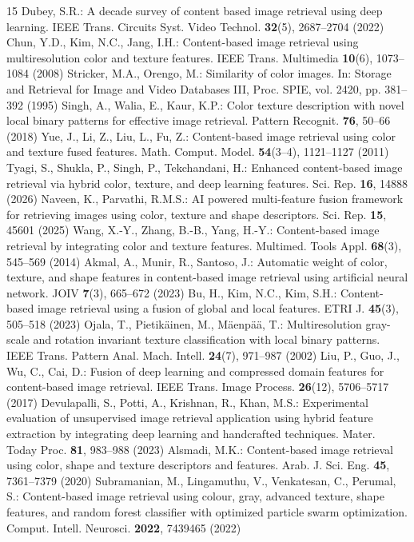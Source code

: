 \documentclass[pdflatex,sn-mathphys-num]{sn-jnl}
\begin{document}
\begin{thebibliography}{15}
 Dubey, S.R.: A decade survey of content based image retrieval using deep learning. IEEE Trans. Circuits Syst. Video Technol. \textbf{32}(5), 2687--2704 (2022)
 Chun, Y.D., Kim, N.C., Jang, I.H.: Content-based image retrieval using multiresolution color and texture features. IEEE Trans. Multimedia \textbf{10}(6), 1073--1084 (2008)
 Stricker, M.A., Orengo, M.: Similarity of color images. In: Storage and Retrieval for Image and Video Databases III, Proc. SPIE, vol. 2420, pp. 381--392 (1995)
 Singh, A., Walia, E., Kaur, K.P.: Color texture description with novel local binary patterns for effective image retrieval. Pattern Recognit. \textbf{76}, 50--66 (2018)
 Yue, J., Li, Z., Liu, L., Fu, Z.: Content-based image retrieval using color and texture fused features. Math. Comput. Model. \textbf{54}(3--4), 1121--1127 (2011)
 Tyagi, S., Shukla, P., Singh, P., Tekchandani, H.: Enhanced content-based image retrieval via hybrid color, texture, and deep learning features. Sci. Rep. \textbf{16}, 14888 (2026)
 Naveen, K., Parvathi, R.M.S.: AI powered multi-feature fusion framework for retrieving images using color, texture and shape descriptors. Sci. Rep. \textbf{15}, 45601 (2025)
 Wang, X.-Y., Zhang, B.-B., Yang, H.-Y.: Content-based image retrieval by integrating color and texture features. Multimed. Tools Appl. \textbf{68}(3), 545--569 (2014)
 Akmal, A., Munir, R., Santoso, J.: Automatic weight of color, texture, and shape features in content-based image retrieval using artificial neural network. JOIV \textbf{7}(3), 665--672 (2023)
 Bu, H., Kim, N.C., Kim, S.H.: Content-based image retrieval using a fusion of global and local features. ETRI J. \textbf{45}(3), 505--518 (2023)
 Ojala, T., Pietik{\"a}inen, M., M{\"a}enp{\"a}{\"a}, T.: Multiresolution gray-scale and rotation invariant texture classification with local binary patterns. IEEE Trans. Pattern Anal. Mach. Intell. \textbf{24}(7), 971--987 (2002)
 Liu, P., Guo, J., Wu, C., Cai, D.: Fusion of deep learning and compressed domain features for content-based image retrieval. IEEE Trans. Image Process. \textbf{26}(12), 5706--5717 (2017)
 Devulapalli, S., Potti, A., Krishnan, R., Khan, M.S.: Experimental evaluation of unsupervised image retrieval application using hybrid feature extraction by integrating deep learning and handcrafted techniques. Mater. Today Proc. \textbf{81}, 983--988 (2023)
 Alsmadi, M.K.: Content-based image retrieval using color, shape and texture descriptors and features. Arab. J. Sci. Eng. \textbf{45}, 7361--7379 (2020)
 Subramanian, M., Lingamuthu, V., Venkatesan, C., Perumal, S.: Content-based image retrieval using colour, gray, advanced texture, shape features, and random forest classifier with optimized particle swarm optimization. Comput. Intell. Neurosci. \textbf{2022}, 7439465 (2022)
\end{thebibliography}
\end{document}
